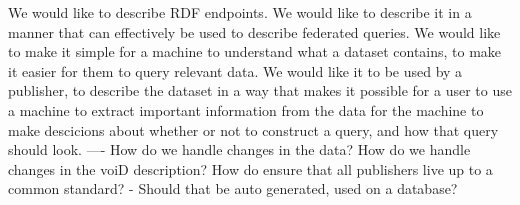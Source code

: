 

















We would like to describe RDF endpoints.
We would like to describe it in a manner that can effectively be used to describe federated queries.
We would like to make it simple for a machine to understand what a dataset contains, to make it easier for them to query relevant data.
We would like it to be used by a publisher, to describe the dataset in a way that makes it possible for a user to use a machine to extract important information from the data for the machine to make descicions about whether or not to construct a query, and how that query should look.    
----
How do we handle changes in the data? How do we handle changes in the voiD description?
How do ensure that all publishers live up to a common standard?
    - Should that be auto generated, used on a database?


